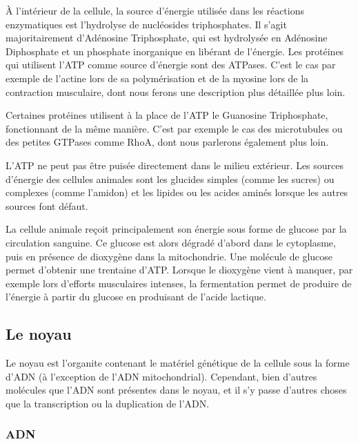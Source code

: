 À l'intérieur de la cellule, la source d'énergie utilisée dans les réactions enzymatiques est l'hydrolyse de nucléosides triphosphates. 
Il s'agit majoritairement d'Adénosine Triphosphate, qui est hydrolysée en Adénosine Diphosphate et un phosphate inorganique en libérant de l'énergie. 
Les protéines qui utilisent l'ATP comme source d'énergie sont des ATPases. 
C'est le cas par exemple de l'actine lors de sa polymérisation et de la myosine  lors de la contraction musculaire, dont nous ferons une description plus détaillée plus loin. 

Certaines protéines utilisent à la place de l'ATP le Guanosine Triphosphate, fonctionnant de la même manière. 
C'est par exemple le cas des microtubules ou des petites GTPases comme RhoA, dont nous parlerons également plus loin. 

L'ATP ne peut pas être puisée directement dans le milieu extérieur. Les sources d'énergie des cellules animales sont les glucides simples (comme les sucres) ou complexes (comme l'amidon) et les lipides ou les acides aminés lorsque les autres sources font défaut. 

La cellule animale reçoit principalement son énergie sous forme de glucose par la circulation sanguine. Ce glucose est alors dégradé d'abord dans le cytoplasme, puis en présence de dioxygène dans la mitochondrie. 
Une molécule de glucose permet d'obtenir une trentaine d'ATP. 
Lorsque le dioxygène vient à manquer, par exemple lors d'efforts musculaires intenses, la fermentation permet de produire de l'énergie à partir du glucose en produisant de l'acide lactique. 

\subsection{Le noyau}

Le noyau est l'organite contenant le matériel génétique de la cellule sous la forme d'ADN (à l'exception de l'ADN mitochondrial). Cependant, bien d'autres molécules que l'ADN sont présentes dans le noyau, et il s'y passe d'autres choses que la transcription ou la duplication de l'ADN. 

\subsubsection{ADN}

